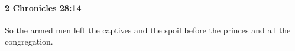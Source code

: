 
		\paragraph{2 Chronicles 28:14} %
			\label{2CHRONICLES-28-14}

			So the armed men left the captives and the spoil before the princes and all the congregation.


